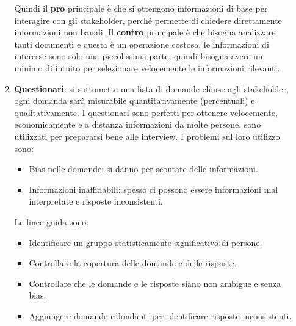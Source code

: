 \begin{itemize}
\begin{enumerate}
                        Quindi il \textbf{pro} principale è che si ottengono
                        informazioni di base per interagire con gli stakeholder,
                        perché permette di chiedere direttamente informazioni non
                        banali. Il \textbf{contro} principale è che bisogna
                        analizzare tanti documenti e questa è un operazione
                        costosa, le informazioni di interesse sono solo una
                        piccolissima parte, quindi bisogna avere un minimo di
                        intuito per selezionare velocemente le informazioni rilevanti.
                  \item \textbf{Questionari}: si sottomette una lista di domande
                        chiuse agli stakeholder, ogni domanda sarà misurabile
                        quantitativamente (percentuali) e qualitativamente. I
                        questionari sono perfetti per ottenere velocemente,
                        economicamente e a distanza informazioni da molte persone,
                        sono utilizzati per prepararsi bene alle interview. I
                        problemi sul loro utilizzo sono:
                        \begin{itemize}
                              \item Bias nelle domande: si danno per scontate
                                    delle informazioni.
                              \item Informazioni inaffidabili: spesso ci possono
                                    essere informazioni mal interpretate e risposte
                                    inconsistenti.
                        \end{itemize}
                        Le linee guida sono:
                        \begin{itemize}
                              \item Identificare un gruppo statisticamente
                                    significativo di persone.
                              \item Controllare la copertura delle domande e delle
                                    risposte.
                              \item Controllare che le domande e le risposte siano
                                    non ambigue e senza bias.
                              \item Aggiungere domande ridondanti per identificare
                                    risposte inconsistenti.

\end{itemize}
\end{enumerate}
\end{itemize}

